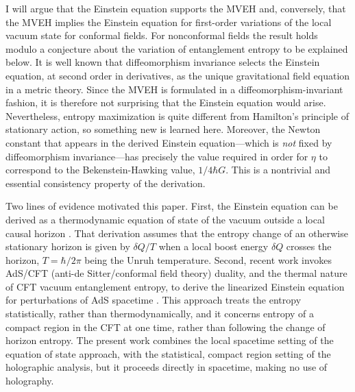 \documentclass[aps,prd,showpacs,groupedaddress,nofootinbib,longbibliography,12pt]{revtex4-1}
\def\d{\delta}\def\D{\Delta}
\begin{document}
I will argue that the Einstein equation supports the MVEH and, conversely, that the MVEH implies the
Einstein equation for first-order  variations of the local vacuum state for conformal fields.
For nonconformal fields the result holds modulo a conjecture about the variation of entanglement 
entropy to be explained below. 
It is well known that diffeomorphism invariance selects the Einstein equation, at second order in derivatives,
as the unique gravitational field equation in a metric theory.  
Since the MVEH is formulated in  a diffeomorphism-invariant fashion, 
it is therefore not surprising that the Einstein equation would arise. Nevertheless, entropy maximization
is quite different from Hamilton's principle of stationary action, so something
new is learned here. Moreover, the Newton constant that appears in the derived 
Einstein equation---which is {\it not} fixed by diffeomorphism invariance---has precisely the value required 
in order for $\eta$ to correspond to the Bekenstein-Hawking value, $1/4\hbar G$. This is a nontrivial and 
essential consistency property of the derivation.


Two lines of evidence motivated this paper.
First, the Einstein equation can be derived as a thermodynamic equation of state of the vacuum
outside a local causal horizon \cite{Jacobson:1995ab}. That derivation assumes that the entropy 
change of an otherwise stationary horizon is given by $\d Q/T$ when a local boost energy $\d Q$ 
crosses the horizon, $T=\hbar/2\pi$ being the Unruh temperature.
%
Second, recent work invokes AdS/CFT (anti-de Sitter/conformal field theory) duality, and the thermal nature of CFT vacuum entanglement entropy, to derive the linearized Einstein equation for perturbations of AdS spacetime \cite{Lashkari:2013koa,Faulkner:2013ica,Swingle:2014uza}. This approach treats the entropy statistically, rather than  
thermodynamically, and it concerns entropy of a compact region in the CFT at one time, rather than following the change of horizon entropy. The present work combines the local spacetime setting of the equation of state approach, with the 
statistical, compact region setting of the holographic analysis, but it proceeds directly in spacetime, 
making no use of holography.   
\end{document}
